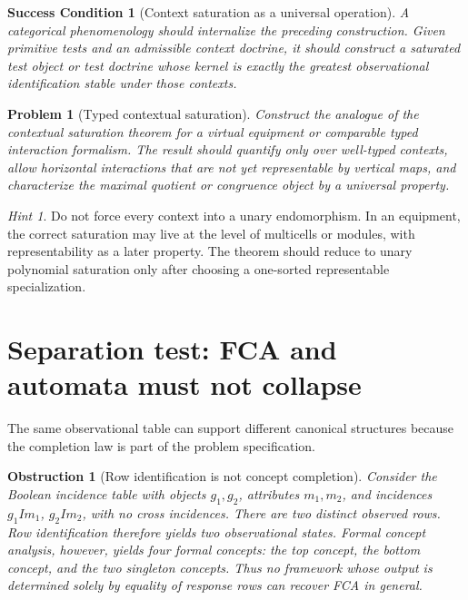 \documentclass[11pt]{article}
\newtheorem{condition}[theorem]{Success Condition}
\newtheorem{problem}[theorem]{Problem}
\newtheorem{obstruction}[theorem]{Obstruction}
\theoremstyle{definition}
\theoremstyle{remark}
\newtheorem{hint}[theorem]{Hint}
\begin{document}
\begin{condition}[Context saturation as a universal operation]
A categorical phenomenology should internalize the preceding construction. Given primitive tests and an admissible context doctrine, it should construct a saturated test object or test doctrine whose kernel is exactly the greatest observational identification stable under those contexts.
\end{condition}

\begin{problem}[Typed contextual saturation]
Construct the analogue of the contextual saturation theorem for a virtual equipment or comparable typed interaction formalism. The result should quantify only over well-typed contexts, allow horizontal interactions that are not yet representable by vertical maps, and characterize the maximal quotient or congruence object by a universal property.
\end{problem}

\begin{hint}
Do not force every context into a unary endomorphism. In an equipment, the correct saturation may live at the level of multicells or modules, with representability as a later property. The theorem should reduce to unary polynomial saturation only after choosing a one-sorted representable specialization.
\end{hint}

\section{Separation test: FCA and automata must not collapse}

The same observational table can support different canonical structures because the completion law is part of the problem specification.

\begin{obstruction}[Row identification is not concept completion]
Consider the Boolean incidence table with objects $g_1,g_2$, attributes $m_1,m_2$, and incidences $g_1 I m_1$, $g_2 I m_2$, with no cross incidences. There are two distinct observed rows. Row identification therefore yields two observational states. Formal concept analysis, however, yields four formal concepts: the top concept, the bottom concept, and the two singleton concepts. Thus no framework whose output is determined solely by equality of response rows can recover FCA in general.
\end{obstruction}
\end{document}
